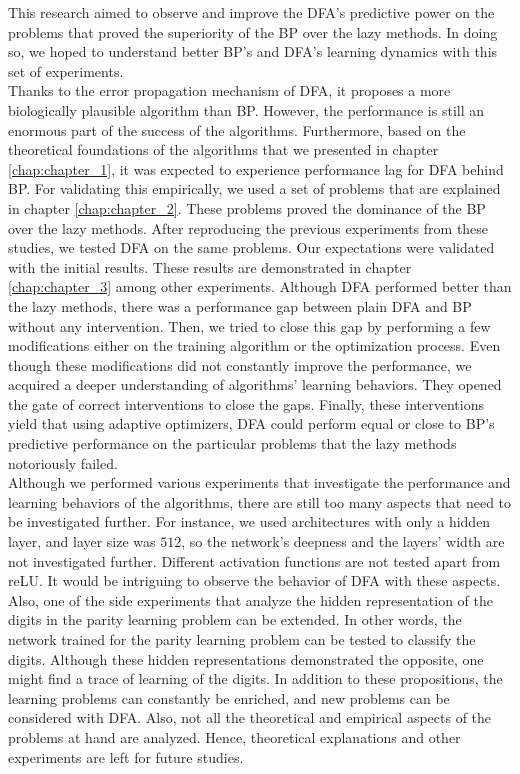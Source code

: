 \documentclass[a4paper, nobind]{templates/ociamthesis}
\begin{document}
This research aimed to observe and improve the DFA's predictive power on the problems that proved the superiority of the BP over the lazy methods. In doing so, we hoped to understand better BP's and DFA's learning dynamics with this set of experiments.\\
Thanks to the error propagation mechanism of DFA, it proposes a more biologically plausible algorithm than BP. However, the performance is still an enormous part of the success of the algorithms. Furthermore, based on the theoretical foundations of the algorithms that we presented in chapter \ref{chap:chapter_1}, it was expected to experience performance lag for DFA behind BP. For validating this empirically, we used a set of problems that are explained in chapter \ref{chap:chapter_2}. These problems proved the dominance of the BP over the lazy methods. After reproducing the previous experiments from these studies, we tested DFA on the same problems. Our expectations were validated with the initial results. These results are demonstrated in chapter \ref{chap:chapter_3} among other experiments. Although DFA performed better than the lazy methods, there was a performance gap between plain DFA and BP without any intervention. Then, we tried to close this gap by performing a few modifications either on the training algorithm or the optimization process. Even though these modifications did not constantly improve the performance, we acquired a deeper understanding of algorithms' learning behaviors. They opened the gate of correct interventions to close the gaps. Finally, these interventions yield that using adaptive optimizers, DFA could perform equal or close to BP's predictive performance on the particular problems that the lazy methods notoriously failed.\\
Although we performed various experiments that investigate the performance and learning behaviors of the algorithms, there are still too many aspects that need to be investigated further. For instance, we used architectures with only a hidden layer, and layer size was \(512\), so the network's deepness and the layers' width are not investigated further. Different activation functions are not tested apart from reLU. It would be intriguing to observe the behavior of DFA with these aspects. Also, one of the side experiments that analyze the hidden representation of the digits in the parity learning problem can be extended. In other words, the network trained for the parity learning problem can be tested to classify the digits. Although these hidden representations demonstrated the opposite, one might find a trace of learning of the digits. In addition to these propositions, the learning problems can constantly be enriched, and new problems can be considered with DFA. Also, not all the theoretical and empirical aspects of the problems at hand are analyzed. Hence, theoretical explanations and other experiments are left for future studies.\\
\end{document}
